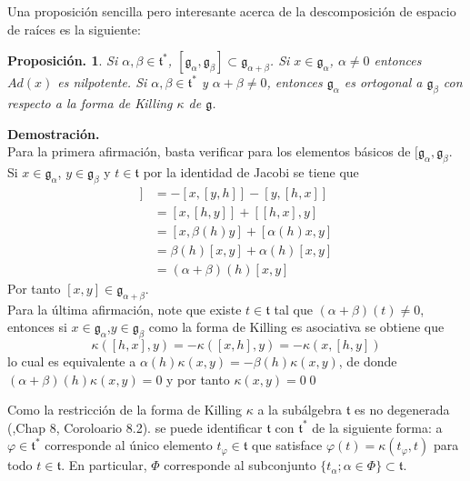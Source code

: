 \documentclass[11pt,a4paper]{article}
\newtheorem{proposition}{Proposici\'on.}
\begin{document}
Una proposición sencilla pero interesante acerca de la descomposición de espacio de raíces es la siguiente:
\begin{proposition}
Si $\alpha, \beta \in \mathfrak{t}^*$, $[\mathfrak{g}_{\alpha}, \mathfrak{g}_{\beta}] \subset \mathfrak{g}_{\alpha+\beta}$. Si $x\in \mathfrak{g}_\alpha$, $\alpha\neq 0$ entonces $Ad(x) $ es nilpotente. Si $\alpha, \beta \in \mathfrak{t}^*$ y $\alpha+ \beta \neq 0$, entonces $\mathfrak{g}_{\alpha}$ es ortogonal a $\mathfrak{g_\beta}$ con respecto a la forma de Killing $\kappa$ de $\mathfrak{g}$.
\end{proposition}
\textbf{Demostración.}\\
Para la primera afirmación, basta verificar para los elementos básicos de $[\mathfrak{g}_{\alpha}, \mathfrak{g}_{\beta}$. Si $x\in \mathfrak{g}_\alpha$, $y\in \mathfrak{g}_\beta$ y $t\in \mathfrak{t}$ por la identidad de Jacobi se tiene que 
\begin{align*}
    [h,[x,y]]&=-[x,[y,h]]-[y,[h,x]] \\
    &= [x,[h,y]] + [[h,x],y] \\
    &=[x, \beta (h) y] + [\alpha(h)x, y ] \\
    &= \beta(h) [x,y]+ \alpha(h)[x,y] \\
    &= (\alpha + \beta)(h)[x,y]
\end{align*}
Por tanto $[x,y]\in \mathfrak{g}_{\alpha+\beta}$. \\
Para la última afirmación, note que existe $t\in \mathfrak{t}$ tal que $(\alpha+ \beta)(t)\neq 0$, entonces si $x\in \mathfrak{g}_{\alpha}$,$y\in \mathfrak{g}_\beta$ como la forma de Killing es asociativa se obtiene que
$$\kappa ([h,x],y)= -\kappa([x,h],y)=- \kappa (x,[h,y]) $$
lo cual es equivalente a $\alpha(h) \kappa(x,y)=-\beta(h) \kappa(x,y)$, de donde $(\alpha + \beta) (h) \kappa (x,y)=0$ y por tanto $\kappa(x,y)=0$\qed

Como la restricción de la forma de Killing $\kappa$  a la subálgebra $\mathfrak{t}$ es no degenerada (\cite{humphreys2012introduction},Chap 8, Coroloario 8.2). se puede identificar $\mathfrak{t}$ con $\mathfrak{t}^*$ de la siguiente forma: a $\varphi \in \mathfrak{t}^*$ corresponde al único elemento $t_{\varphi} \in \mathfrak{t}$ que satisface $\varphi(t)=\kappa(t_{\varphi},t)$ para todo $t\in  \mathfrak{t}$. En particular, $\Phi$ corresponde al subconjunto $\{t_{\alpha}; \alpha \in \Phi \}\subset \mathfrak{t}$. \\
\end{document}
